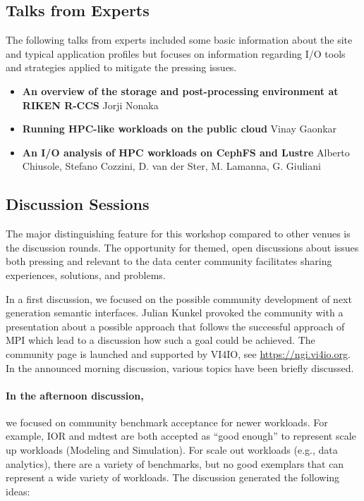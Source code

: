\documentclass{llncs}
\begin{document}
\subsection{Talks from Experts}

The following talks from experts included some basic information about the site and typical application profiles but focuses on information regarding I/O tools and strategies applied to mitigate the pressing issues.

\begin{itemize}

\item \textbf{An overview of the storage and post-processing environment at RIKEN R-CCS} Jorji Nonaka\\

\item \textbf{Running HPC-like workloads on the public cloud} Vinay Gaonkar\\

\item \textbf{An I/O analysis of HPC workloads on CephFS and Lustre} Alberto Chiusole, Stefano Cozzini, D. van der Ster, M. Lamanna, G. Giuliani\\

\end{itemize}

\subsection{Discussion Sessions}

The major distinguishing feature for this workshop compared to other venues is the discussion rounds.
The opportunity for themed, open discussions about issues both pressing and relevant to the data center
community facilitates sharing experiences, solutions, and problems.

In a first discussion, we focused on the possible community development of next generation semantic interfaces. Julian Kunkel provoked the community with a presentation about a possible approach that follows the successful approach of MPI which lead to a discussion how such a goal could be achieved.
The community page is launched and supported by VI4IO, see \url{https://ngi.vi4io.org}.
In the announced morning discussion, various topics have been briefly discussed.

\paragraph{In the afternoon discussion,} we focused on community benchmark acceptance for newer workloads. For example, IOR and mdtest are both accepted as ``good enough'' to represent scale up workloads (Modeling and Simulation). For scale out workloads (e.g., data analytics), there are a variety of benchmarks, but no good exemplars that can represent a wide variety of workloads. The discussion generated the following ideas:
\end{document}
